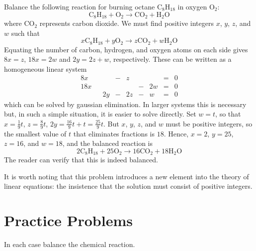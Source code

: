 \documentclass{ximera}
\begin{document}
\begin{example}\label{001872}
Balance the following reaction for burning octane $\mbox{C}_8\mbox{H}_{18}$ in oxygen $\mbox{O}_2$:
\begin{equation*}
\mbox{C}_8\mbox{H}_{18} + \mbox{O}_2 \rightarrow \mbox{CO}_2 + \mbox{H}_2\mbox{O}
\end{equation*}
where $\mbox{CO}_2$ represents carbon dioxide. We must find positive integers $x$, $y$, $z$, and $w$ such that
\begin{equation*}
x\mbox{C}_8\mbox{H}_{18} + y\mbox{O}_2 \rightarrow z\mbox{CO}_2 + w\mbox{H}_2\mbox{O}
\end{equation*}
Equating the number of carbon, hydrogen, and oxygen atoms on each side gives $8x = z$, $18x = 2w$ and $2y = 2z + w$, respectively. These can be written as a homogeneous linear system
\begin{equation*}
\begin{array}{rlrlrlrcr}
 	 8x &   &   & - & z &   &   & = & 0 \\
	18x &   &   &   &   & - &2w & = & 0 \\
	    &   &2y & - &2z & - & w & = & 0
\end{array}
\end{equation*}
which can be solved by gaussian elimination. In larger systems this is
necessary but, in such a simple situation, it is easier to solve
directly. Set $w = t$, so that $x = \frac{1}{9}t$, $z = \frac{8}{9}t$, $2y = \frac{16}{9}t + t = \frac{25}{9}t$. But $x$, $y$, $z$, and $w$ must be positive integers, so the smallest value of $t$ that eliminates fractions is $18$. Hence, $x = 2$, $y = 25$, $z = 16$, and $w = 18$, and the balanced reaction is
\begin{equation*}
2\mbox{C}_8\mbox{H}_{18} + 25\mbox{O}_2 \rightarrow 16\mbox{CO}_2 + 18\mbox{H}_2\mbox{O}
\end{equation*}
The reader can verify that this is indeed balanced.
\end{example}

It is worth noting that this problem introduces a new element into the theory of linear equations: the insistence that the solution must consist of positive integers.

\section*{Practice Problems}

In each case balance the chemical reaction.
\end{document}
